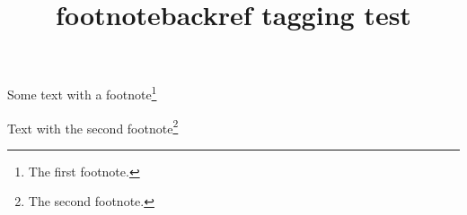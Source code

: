 \documentclass{article}
\title{footnotebackref tagging test}
\begin{document}
Some text with a footnote\footnote{The first footnote.}

Text with the second footnote\footnote[4]{The second footnote.}
\end{document}

